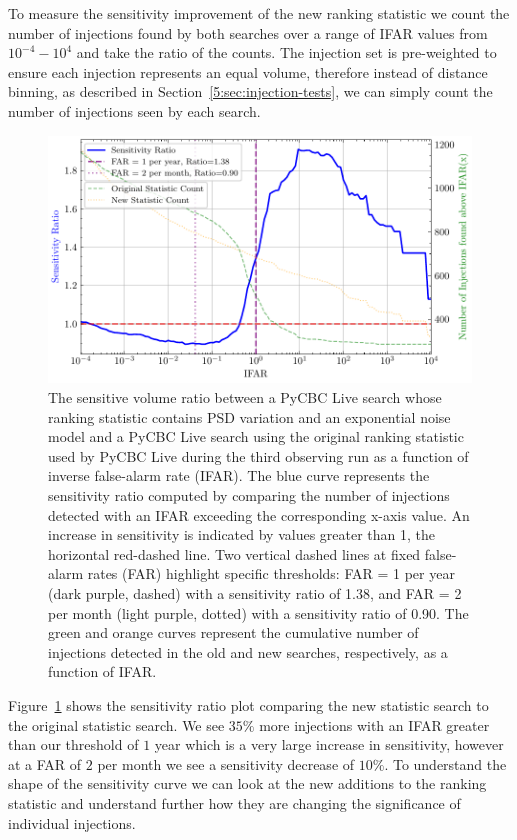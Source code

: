 To measure the sensitivity improvement of the new ranking statistic we count the number of injections found by both searches over a range of IFAR values from $10^{-4} - 10^{4}$ and take the ratio of the counts. The injection set is pre-weighted to ensure each injection represents an equal volume, therefore instead of distance binning, as described in Section~\ref{5:sec:injection-tests}, we can simply count the number of injections seen by each search.
%
\begin{figure}
  \centering
  \begin{minipage}[t]{1.0\linewidth}
  
    \includegraphics[width=1.0\textwidth]{images/5_pycbclive/plots/fits_psd_vt_ratio_with_counts.pdf}
    \caption{The sensitive volume ratio between a PyCBC Live search whose ranking statistic contains PSD variation and an exponential noise model and a PyCBC Live search using the original ranking statistic used by PyCBC Live during the third observing run as a function of inverse false-alarm rate (IFAR). The blue curve represents the sensitivity ratio computed by comparing the number of injections detected with an IFAR exceeding the corresponding x-axis value. An increase in sensitivity is indicated by values greater than 1, the horizontal red-dashed line. Two vertical dashed lines at fixed false-alarm rates (FAR) highlight specific thresholds: FAR = 1 per year (dark purple, dashed) with a sensitivity ratio of 1.38, and FAR = 2 per month (light purple, dotted) with a sensitivity ratio of 0.90. The green and orange curves represent the cumulative number of injections detected in the old and new searches, respectively, as a function of IFAR.}
    \label{5:fig:fits-psdvar-sensitivity}

  \end{minipage}
\end{figure}
%
Figure~\ref{5:fig:fits-psdvar-sensitivity} shows the sensitivity ratio plot comparing the new statistic search to the original statistic search. We see $35\%$ more injections with an IFAR greater than our threshold of $1$ year which is a very large increase in sensitivity, however at a FAR of $2$ per month we see a sensitivity decrease of $10\%$. To understand the shape of the sensitivity curve we can look at the new additions to the ranking statistic and understand further how they are changing the significance of individual injections.

